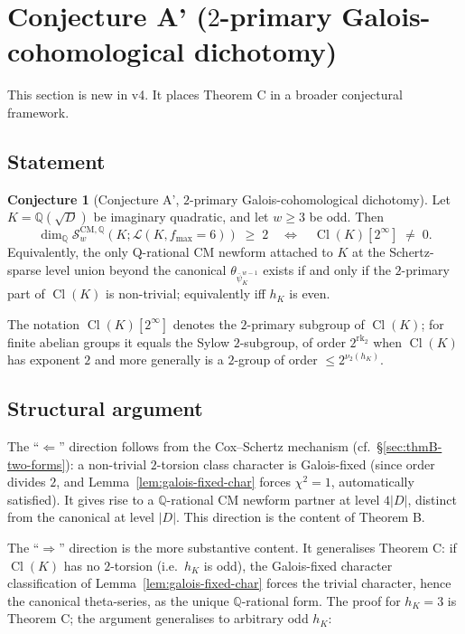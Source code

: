 \documentclass[11pt,a4paper]{amsart}
\theoremstyle{definition}
\newtheorem{conjecture}[theorem]{Conjecture}
\DeclareMathOperator{\Cl}{Cl}
\newcommand{\Q}{\mathbb{Q}}
\newcommand{\Lcal}{\mathcal{L}}
\newcommand{\Scal}{\mathcal{S}}
\newcommand{\hK}{h_{K}}
\newcommand{\rktwo}{\mathrm{rk}_2}
\begin{document}
\section{Conjecture A' ($2$-primary Galois-cohomological dichotomy)}\label{sec:conj-A-prime}

This section is new in v4. It places Theorem C in a broader conjectural framework.

\subsection{Statement}\label{sec:conjA-prime-statement}

\begin{conjecture}[Conjecture A', $2$-primary Galois-cohomological dichotomy]\label{conj:A-prime}
Let $K = \Q(\sqrt{D})$ be imaginary quadratic, and let $w \ge 3$ be odd. Then
\[
\dim_\Q \Scal_w^{\mathrm{CM}, \Q}(K; \Lcal(K, f_{\max} = 6)) \;\ge\; 2 \quad\Longleftrightarrow\quad \Cl(K)[2^\infty] \;\ne\; 0.
\]
Equivalently, the only Q-rational CM newform attached to $K$ at the Schertz-sparse level union beyond the canonical $\theta_{\bar\psi_K^{w-1}}$ exists if and only if the $2$-primary part of $\Cl(K)$ is non-trivial; equivalently iff $\hK$ is even.
\end{conjecture}

The notation $\Cl(K)[2^\infty]$ denotes the $2$-primary subgroup of $\Cl(K)$; for finite abelian groups it equals the Sylow $2$-subgroup, of order $2^{\rktwo}$ when $\Cl(K)$ has exponent $2$ and more generally is a $2$-group of order $\le 2^{\nu_2(\hK)}$.

\subsection{Structural argument}\label{sec:conjA-prime-argument}

The ``$\Leftarrow$'' direction follows from the Cox--Schertz mechanism (cf.\ \S\ref{sec:thmB-two-forms}): a non-trivial $2$-torsion class character is Galois-fixed (since order divides $2$, and Lemma~\ref{lem:galois-fixed-char} forces $\chi^2 = 1$, automatically satisfied). It gives rise to a $\Q$-rational CM newform partner at level $4|D|$, distinct from the canonical at level $|D|$. This direction is the content of Theorem B.

The ``$\Rightarrow$'' direction is the more substantive content. It generalises Theorem C: if $\Cl(K)$ has no $2$-torsion (i.e.\ $\hK$ is odd), the Galois-fixed character classification of Lemma~\ref{lem:galois-fixed-char} forces the trivial character, hence the canonical theta-series, as the unique $\Q$-rational form. The proof for $\hK = 3$ is Theorem C; the argument generalises to arbitrary odd $\hK$:
\end{document}
